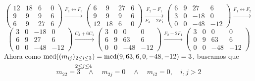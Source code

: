 \documentclass[12pt]{article}
\begin{document}
\begin{ejercicio}
\begin{enumerate}[label=(\alph*)]
            $$\begin{pmatrix}
                12 & 18 & 6 & 0 \\
                9 & 9 & 9 & 6 \\
                6 & 9 & 27 & 6
            \end{pmatrix} 
            \xrightarrow{F_1 \leftrightarrow F_3} 
            \begin{pmatrix}
                6 & 9 & 27 & 6 \\
                9 & 9 & 9 & 6 \\
                12 & 18 & 6 & 0
            \end{pmatrix} 
            \underset{F_3-2F_1}{\xrightarrow{F_2-F_1}}
            \begin{pmatrix}
                6 & 9 & 27 & 6 \\
                3 & 0 & -18 & 0 \\
                0 & 0 & -48 & -12
            \end{pmatrix}
            \xrightarrow{F_1 \leftrightarrow F_2}$$
            $$\begin{pmatrix}
                3 & 0 & -18 & 0 \\
                6 & 9 & 27 & 6 \\
                0 & 0 & -48 & -12
            \end{pmatrix}
            \xrightarrow{C_3 + 6C_1}
            \begin{pmatrix}
                3 & 0 & 0 & 0 \\
                6 & 9 & 63 & 6 \\
                0 & 0 & -48 & -12
            \end{pmatrix}
            \xrightarrow{F_2 - 2F_1}
            \begin{pmatrix}
                3 & 0 & 0 & 0 \\
                0 & 9 & 63 & 6 \\
                0 & 0 & -48 & -12
            \end{pmatrix}
            $$
            Ahora como $\operatorname{mcd}((m_{ij})_{\substack{2\le i\le 3 \\\\ 2\le j\le 4}}) = \operatorname{mcd}(9,63,6,0,-48,-12) = 3$, buscamos que $$m_{22} = 3 \quad \land \quad m_{2j} = 0 \quad \land \quad m_{i2} = 0, \quad i,j>2$$


\end{enumerate}
\end{ejercicio}
\end{document}
